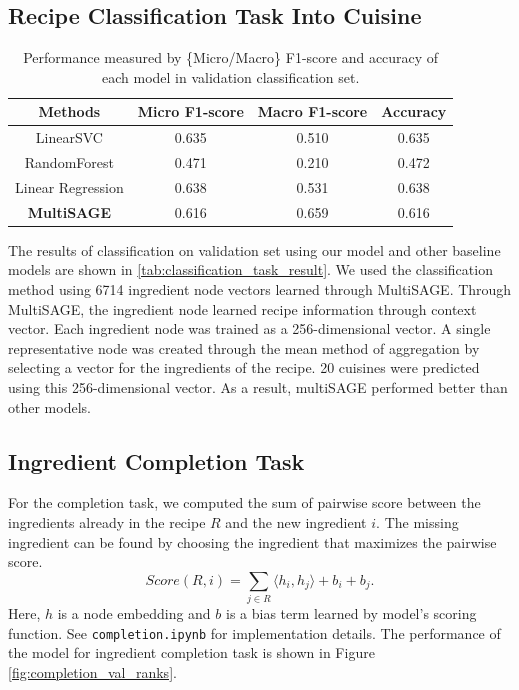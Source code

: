  \subsection{Recipe Classification Task Into Cuisine}
 
 \begin{table}[btp!]
    \centering
    \begin{tabular}{ c c c c }
        \toprule
        \textbf{Methods} & \textbf{Micro F1-score} & \textbf{Macro F1-score} & \textbf{Accuracy} \\
        \midrule
        LinearSVC & 0.635 & 0.510 & 0.635 \\
        RandomForest & 0.471 & 0.210 & 0.472 \\
        Linear Regression & 0.638 & 0.531 & 0.638 \\
        \textbf{MultiSAGE} & 0.616 & 0.659 & 0.616 \\
        \bottomrule
        
    \end{tabular}
    \caption{\label{tab:classification_task_result} Performance measured by \{Micro/Macro\} F1-score and accuracy of each model in validation classification set.}

 \end{table}
 
  The results of classification on validation set using our model and other baseline models are shown in \autoref{tab:classification_task_result}.  
  We used the classification method using 6714 ingredient node vectors learned through MultiSAGE. Through MultiSAGE, the ingredient node learned recipe information through context vector. Each ingredient node was trained as a 256-dimensional vector. A single representative node was created through the mean method of aggregation by selecting a vector for the ingredients of the recipe. 20 cuisines were predicted using this 256-dimensional vector. As a result, multiSAGE performed better than other models.
  
 \subsection{Ingredient Completion Task}
 For the completion task, we computed the sum of pairwise score between the ingredients already in the recipe $R$ and the new ingredient $i$. The missing ingredient can be found by choosing the ingredient that maximizes the pairwise score.
 \begin{equation}
     Score(R, i) = \sum_{j \in R} \langle h_i, h_j \rangle + b_i + b_j.
 \end{equation}
 Here, $h$ is a node embedding and $b$ is a bias term learned by model's scoring function. See \texttt{completion.ipynb} for implementation details. The performance of the model for ingredient completion task is shown in Figure \autoref{fig:completion_val_ranks}.

